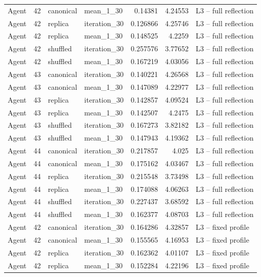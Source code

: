 \begin{table}[htbp!]
\begin{tabular}{lrllrrl}
Agent & 42 & canonical & mean\_1\_30 & 0.14381 & 4.24553 & L3 -- full reflection \\
Agent & 42 & replica & iteration\_30 & 0.126866 & 4.25746 & L3 -- full reflection \\
Agent & 42 & replica & mean\_1\_30 & 0.148525 & 4.2259 & L3 -- full reflection \\
Agent & 42 & shuffled & iteration\_30 & 0.257576 & 3.77652 & L3 -- full reflection \\
Agent & 42 & shuffled & mean\_1\_30 & 0.167219 & 4.03056 & L3 -- full reflection \\
Agent & 43 & canonical & iteration\_30 & 0.140221 & 4.26568 & L3 -- full reflection \\
Agent & 43 & canonical & mean\_1\_30 & 0.147089 & 4.22977 & L3 -- full reflection \\
Agent & 43 & replica & iteration\_30 & 0.142857 & 4.09524 & L3 -- full reflection \\
Agent & 43 & replica & mean\_1\_30 & 0.142507 & 4.2475 & L3 -- full reflection \\
Agent & 43 & shuffled & iteration\_30 & 0.167273 & 3.82182 & L3 -- full reflection \\
Agent & 43 & shuffled & mean\_1\_30 & 0.147943 & 4.19362 & L3 -- full reflection \\
Agent & 44 & canonical & iteration\_30 & 0.217857 & 4.025 & L3 -- full reflection \\
Agent & 44 & canonical & mean\_1\_30 & 0.175162 & 4.03467 & L3 -- full reflection \\
Agent & 44 & replica & iteration\_30 & 0.215548 & 3.73498 & L3 -- full reflection \\
Agent & 44 & replica & mean\_1\_30 & 0.174088 & 4.06263 & L3 -- full reflection \\
Agent & 44 & shuffled & iteration\_30 & 0.227437 & 3.68592 & L3 -- full reflection \\
Agent & 44 & shuffled & mean\_1\_30 & 0.162377 & 4.08703 & L3 -- full reflection \\
Agent & 42 & canonical & iteration\_30 & 0.164286 & 4.32857 & L3 -- fixed profile \\
Agent & 42 & canonical & mean\_1\_30 & 0.155565 & 4.16953 & L3 -- fixed profile \\
Agent & 42 & replica & iteration\_30 & 0.162362 & 4.01107 & L3 -- fixed profile \\
Agent & 42 & replica & mean\_1\_30 & 0.152284 & 4.22196 & L3 -- fixed profile \\

\end{tabular}
\end{table}
